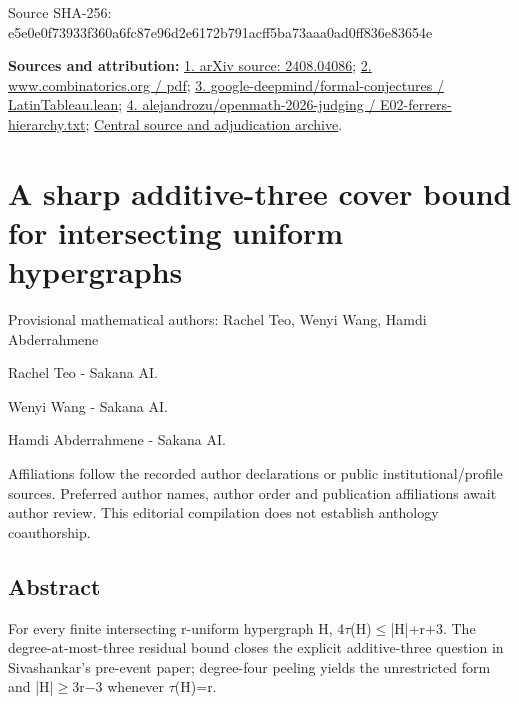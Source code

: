 \documentclass[11pt,a4paper]{article}
\begin{document}
\begin{samepage}
{\small Source SHA-256: e5e0e0f73933f360a6fc87e96d2e6172b791acff5ba73aaa0ad0ff836e83654e\par}

{\small\textbf{Sources and attribution:} \href{https://arxiv.org/abs/2408.04086}{1. arXiv source: 2408.04086}; \href{https://www.combinatorics.org/ojs/index.php/eljc/article/download/v32i2p48/pdf/}{2. www.combinatorics.org / pdf}; \href{https://github.com/google-deepmind/formal-conjectures/blob/main/FormalConjectures/Paper/LatinTableau.lean}{3. google-deepmind/formal-conjectures / LatinTableau.lean}; \href{https://github.com/alejandrozu/openmath-2026-judging/blob/d0ed487f487fa7ec814ff705ab55249983fe8707/OpenMath-Judging/review/entries/E02-ferrers-hierarchy.txt}{4. alejandrozu/openmath-2026-judging / E02-ferrers-hierarchy.txt}; \href{https://github.com/alejandrozu/openmath-2026-judging}{Central source and adjudication archive}.\par}

\end{samepage}
\clearpage
\section{A sharp additive-three cover bound for intersecting uniform hypergraphs}
{\small Provisional mathematical authors: Rachel Teo, Wenyi Wang, Hamdi Abderrahmene\par}\medskip
{\small Rachel Teo  -  Sakana AI.\par}

{\small Wenyi Wang  -  Sakana AI.\par}

{\small Hamdi Abderrahmene  -  Sakana AI.\par}

{\small Affiliations follow the recorded author declarations or public institutional/profile sources. Preferred author names, author order and publication affiliations await author review. This editorial compilation does not establish anthology coauthorship.\par}

\subsection{Abstract}
For every finite intersecting r-uniform hypergraph H, 4\ensuremath{\tau}(H)\ensuremath{\leq}|H|+r+3. The degree-at-most-three residual bound closes the explicit additive-three question in Sivashankar's pre-event paper; degree-four peeling yields the unrestricted form and |H|\ensuremath{\geq}3r\ensuremath{-}3 whenever \ensuremath{\tau}(H)=r.
\end{document}
